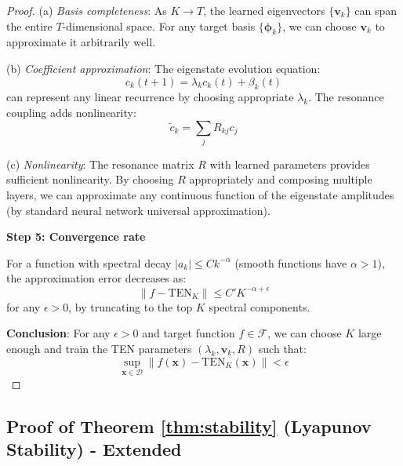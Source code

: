 \documentclass[11pt,letterpaper]{article}
\newcommand{\norm}[1]{\left\|#1\right\|}
\begin{document}
\begin{proof}
(a) \textit{Basis completeness}: As $K \to T$, the learned eigenvectors $\{\mathbf{v}_k\}$ can span the entire $T$-dimensional space. For any target basis $\{\mathbf{\phi}_k\}$, we can choose $\mathbf{v}_k$ to approximate it arbitrarily well.

(b) \textit{Coefficient approximation}: The eigenstate evolution equation:
\begin{equation}
    c_k(t+1) = \lambda_k c_k(t) + \beta_k(t)
\end{equation}
can represent any linear recurrence by choosing appropriate $\lambda_k$. The resonance coupling adds nonlinearity:
\begin{equation}
    \tilde{c}_k = \sum_j R_{kj} c_j
\end{equation}

(c) \textit{Nonlinearity}: The resonance matrix $R$ with learned parameters provides sufficient nonlinearity. By choosing $R$ appropriately and composing multiple layers, we can approximate any continuous function of the eigenstate amplitudes (by standard neural network universal approximation).

\textbf{Step 5: Convergence rate}

For a function with spectral decay $|a_k| \leq C k^{-\alpha}$ (smooth functions have $\alpha > 1$), the approximation error decreases as:
\begin{equation}
    \norm{f - \text{TEN}_K} \leq C' K^{-\alpha+\epsilon}
\end{equation}
for any $\epsilon > 0$, by truncating to the top $K$ spectral components.

\textbf{Conclusion}: For any $\epsilon > 0$ and target function $f \in \mathcal{F}$, we can choose $K$ large enough and train the TEN parameters $(\lambda_k, \mathbf{v}_k, R)$ such that:
\begin{equation}
    \sup_{\mathbf{x} \in \mathcal{D}} \norm{f(\mathbf{x}) - \text{TEN}_K(\mathbf{x})} < \epsilon
\end{equation}
\end{proof}

\subsection{Proof of Theorem \ref{thm:stability} (Lyapunov Stability) - Extended}
\end{document}
